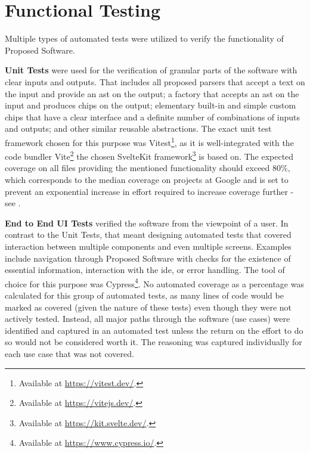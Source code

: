 
\section{Functional Testing}

Multiple types of automated tests were utilized to verify the functionality of Proposed Software.

\textbf{Unit Tests} were used for the verification of granular parts of the software with clear inputs and outputs.
That includes all proposed parsers that accept a text on the input and provide an \gls{ast} on the output; a factory that accepts an \gls{ast} on the input and produces chips on the output; elementary built-in and simple custom chips that have a clear interface and a definite number of combinations of inputs and outputs; and other similar reusable abstractions.
The exact unit test framework chosen for this purpose was Vitest\footnote{Available at \url{https://vitest.dev/}.}, as it is well-integrated with the code bundler Vite\footnote{Available at \url{https://vitejs.dev/}.} the chosen SvelteKit framework\footnote{Available at \url{https://kit.svelte.dev/}.} is based on.
The expected coverage on all files providing the mentioned functionality should exceed 80\%, which corresponds to the median coverage on projects at Google and is set to prevent an exponential increase in effort required to increase coverage further - see .

\textbf{End to End UI Tests} verified the software from the viewpoint of a user.
In contrast to the Unit Tests, that meant designing automated tests that covered interaction between multiple components and even multiple screens.
Examples include navigation through Proposed Software with checks for the existence of essential information, interaction with the \gls{ide}, or error handling.
The tool of choice for this purpose was Cypress\footnote{Available at \url{https://www.cypress.io/}.}.
No automated coverage as a percentage was calculated for this group of automated tests, as many lines of code would be marked as covered (given the nature of these tests) even though they were not actively tested.
Instead, all major paths through the software (use cases) were identified and captured in an automated test unless the return on the effort to do so would not be considered worth it.
The reasoning was captured individually for each use case that was not covered.

